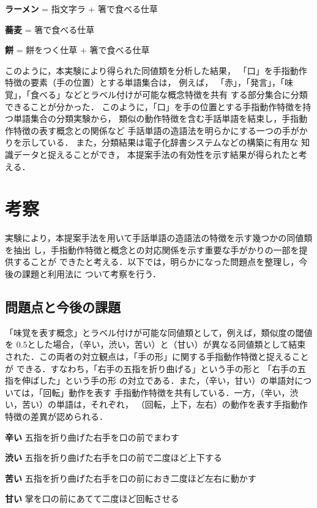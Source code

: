 \begin{list}{}{\setlength{\topsep}{3pt}}
\item [{\bf ラーメン}] = 指文字ラ + 箸で食べる仕草
\item [{\bf 蕎麦}]     = 箸で食べる仕草
\item [{\bf 餅}]      = 餅をつく仕草 + 箸で食べる仕草 
\end{list}

\noindent
このように，本実験により得られた同値類を分析した結果，
「口」を手指動作特徴の要素（手の位置）とする単語集合は，
例えば，
「赤」，「発言」，「味覚」，「食べる」などとラベル付けが可能な概念特徴を共有
する部分集合に分類できることが分かった．
このように，「口」を手の位置とする手指動作特徴を持つ単語集合の分類実験から，
類似の動作特徴を含む手話単語を結束し，手指動作特徴の表す概念との関係など
手話単語の造語法を明らかにする一つの手がかりを示している．
また，分類結果は電子化辞書システムなどの構築に有用な
知識データと捉えることができ，
本提案手法の有効性を示す結果が得られたと考える．

\section{考察}

実験により，本提案手法を用いて手話単語の造語法の特徴を示す幾つかの同値類を抽出
し，手指動作特徴と概念との対応関係を示す重要な手がかりの一部を提供することが
できたと考える．以下では，明らかになった問題点を整理し，今後の課題と利用法に
ついて考察を行う．

\subsection{問題点と今後の課題}

「味覚を表す概念」とラベル付けが可能な同値類として，例えば，類似度の閾値を
$0.5$とした場合，（辛い，渋い，苦い）と（甘い）が異なる同値類として結束
された．この両者の対立観点は，「手の形」に関する手指動作特徴と捉えることが
できる．すなわち，「右手の五指を折り曲げる」という手の形と
「右手の五指を伸ばした」という手の形
の対立である．また，（辛い，甘い）の単語対については，「回転」動作を表す
手指動作特徴を共有している．一方，（辛い，渋い，苦い）の単語は，それぞれ，
（回転，上下，左右）の動作を表す手指動作特徴の差異が認められる．

\begin{list}{}{\setlength{\topsep}{3pt}}
\item [{\bf 辛い}]
五指を折り曲げた右手を口の前でまわす
\item [{\bf 渋い}]
五指を折り曲げた右手を口の前で二度ほど上下する
\item [{\bf 苦い}]
五指を折り曲げた右手を口の前におき二度ほど左右に動かす
\item [{\bf 甘い}]
掌を口の前にあてて二度ほど回転させる
\end{list}

